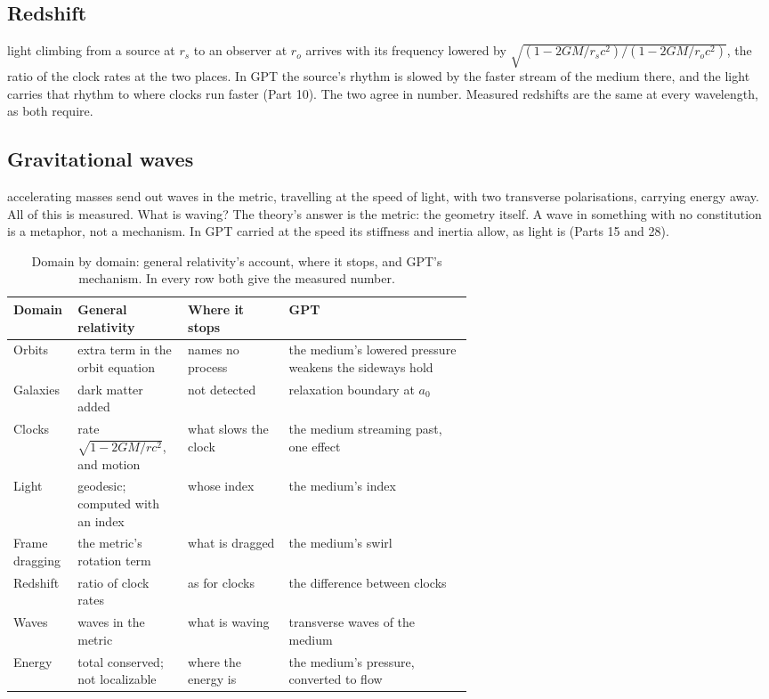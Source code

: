 \documentclass[11pt,a4paper]{article}
\begin{document}
\subsection{Redshift}

 light climbing from a source at $r_s$ to an observer at $r_o$ arrives with its frequency lowered by $\sqrt{(1-2GM/r_sc^2)/(1-2GM/r_oc^2)}$, the ratio of the clock rates at the two places. In GPT  the source's rhythm is slowed by the faster stream of the medium there, and the light carries that rhythm to where clocks run faster (Part 10). The two agree in number. Measured redshifts are the same at every wavelength, as both require.

\subsection{Gravitational waves}

 accelerating masses send out waves in the metric, travelling at the speed of light, with two transverse polarisations, carrying energy away. All of this is measured. What is waving? The theory's answer is the metric: the geometry itself. A wave in something with no constitution is a metaphor, not a mechanism. In GPT  carried at the speed its stiffness and inertia allow, as light is (Parts 15 and 28).

\begin{table}[t]\centering\small
\caption{Domain by domain: general relativity's account, where it stops, and GPT's mechanism. In every row both give the measured number.}
\begin{tabularx}{\linewidth}{@{}>{\raggedright}p{0.14\linewidth} >{\raggedright}p{0.24\linewidth} >{\raggedright}p{0.22\linewidth} X@{}}\toprule
\textbf{Domain} & \textbf{General relativity} & \textbf{Where it stops} & \textbf{GPT}\\\midrule
Orbits & extra term in the orbit equation & names no process & the medium's lowered pressure weakens the sideways hold\\
Galaxies & dark matter added & not detected & relaxation boundary at $a_0$\\
Clocks & rate $\sqrt{1-2GM/rc^2}$, and motion & what slows the clock & the medium streaming past, one effect\\
Light & geodesic; computed with an index & whose index & the medium's index\\
Frame dragging & the metric's rotation term & what is dragged & the medium's swirl\\
Redshift & ratio of clock rates & as for clocks & the difference between clocks\\
Waves & waves in the metric & what is waving & transverse waves of the medium\\
Energy & total conserved; not localizable & where the energy is & the medium's pressure, converted to flow\\\bottomrule
\end{tabularx}\label{tab:domains}\end{table}
\end{document}
